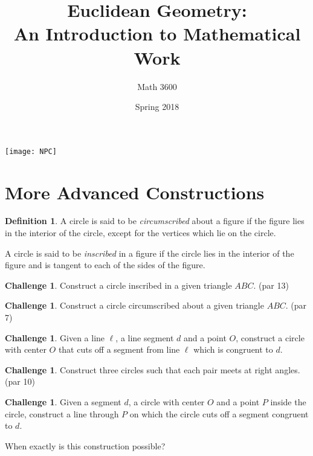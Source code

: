 \documentclass{tufte-handout}
\title{Euclidean Geometry:\\An Introduction to Mathematical Work}
\author[]{Math 3600}
\date{Spring 2018}
\theoremstyle{definition}
\newtheorem*{definition}{Definition}
\newtheorem{challenge}[problem]{Challenge}
\begin{document}
\maketitle

\begin{marginfigure}
    \texttt{[image: NPC]}
\end{marginfigure}

\setcounter{section}{12}
\section{More Advanced Constructions}

\begin{definition}\label{defn:circumscribed}
A circle is said to be \emph{circumscribed} about a figure if the figure lies in the interior of the circle, except for the vertices which lie on the circle.

A circle is said to be \emph{inscribed} in a figure if the circle lies in the interior of the figure and is tangent to each of the sides of the figure.
\end{definition}

\begin{challenge}\label{chal:triangle-inscribe-circle}
Construct a circle inscribed in a given triangle $ABC$. (par 13)
\end{challenge}

\begin{challenge}\label{chal:triangle-circumscribe-circle}
Construct a circle circumscribed about a given triangle $ABC$. (par 7)
\end{challenge}



\begin{challenge}\label{chal:cut-segment-by-circle}
Given a line $\ell$, a line segment $d$ and a point $O$, construct a circle with center $O$ that cuts off a segment from line $\ell$ which is congruent to $d$.
\end{challenge}



\begin{challenge}\label{chal:three-perp-circles}
Construct three circles such that each pair meets at right angles. (par 10)
\end{challenge}

\begin{challenge}\label{chal:cut-circle-by-segment}
Given a segment $d$, a circle with center $O$ and a point $P$ inside the circle, construct a line through $P$ on which the circle cuts off a segment congruent to $d$.

When exactly is this construction possible?
\end{challenge}
\end{document}
